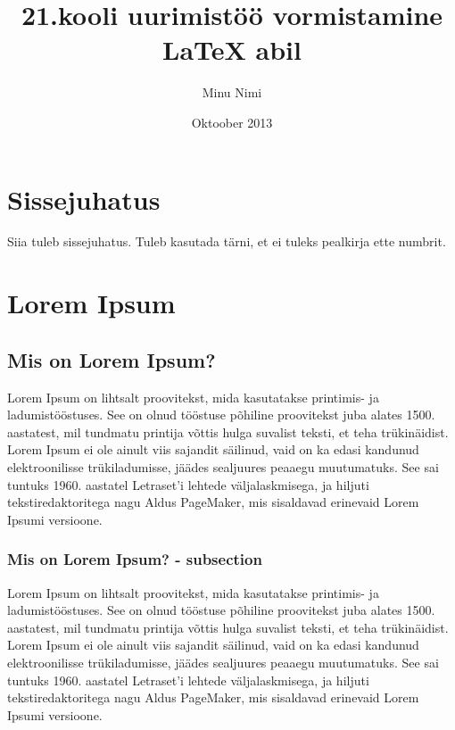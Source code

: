\documentclass{21kuur}
\begin{document}
\title{21.kooli uurimistöö vormistamine LaTeX abil}
\author{Minu Nimi}
\date{Oktoober 2013}
\maketitle

\chapter*{Sissejuhatus}
Siia tuleb sissejuhatus. Tuleb kasutada tärni, et ei tuleks pealkirja ette numbrit. 


\chapter{Lorem Ipsum}

\section{Mis on Lorem Ipsum?}
Lorem Ipsum on lihtsalt proovitekst, mida kasutatakse printimis- ja ladumistööstuses. See on olnud tööstuse põhiline proovitekst juba alates 1500. aastatest, mil tundmatu printija võttis hulga suvalist teksti, et teha trükinäidist. Lorem Ipsum ei ole ainult viis sajandit säilinud, vaid on ka edasi kandunud elektroonilisse trükiladumisse, jäädes sealjuures peaaegu muutumatuks. See sai tuntuks 1960. aastatel Letraset'i lehtede väljalaskmisega, ja hiljuti tekstiredaktoritega nagu Aldus PageMaker, mis sisaldavad erinevaid Lorem Ipsumi versioone.

\subsection{Mis on Lorem Ipsum? - subsection}
Lorem Ipsum on lihtsalt proovitekst, mida kasutatakse printimis- ja ladumistööstuses. See on olnud tööstuse põhiline proovitekst juba alates 1500. aastatest, mil tundmatu printija võttis hulga suvalist teksti, et teha trükinäidist. Lorem Ipsum ei ole ainult viis sajandit säilinud, vaid on ka edasi kandunud elektroonilisse trükiladumisse, jäädes sealjuures peaaegu muutumatuks. See sai tuntuks 1960. aastatel Letraset'i lehtede väljalaskmisega, ja hiljuti tekstiredaktoritega nagu Aldus PageMaker, mis sisaldavad erinevaid Lorem Ipsumi versioone.
\end{document}
